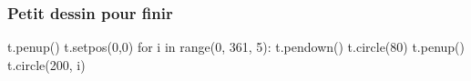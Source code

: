 \documentclass{beamer}
\begin{document}
\begin{frame}[fragile]
   \frametitle{Petit dessin pour finir}

   \begin{pyverbatim}
      t.penup()
      t.setpos(0,0)
      for i in range(0, 361, 5):
         t.pendown()
         t.circle(80)
         t.penup()
         t.circle(200, i)
   \end{pyverbatim}
\end{frame}
%
%
%
%
\end{document}
